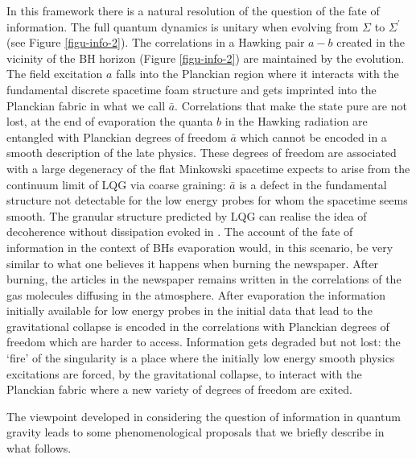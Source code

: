 \documentclass[aps, nofootinbib,superscriptaddress,12pt]{revtex4-2}
\begin{document}
In this framework there is a natural resolution of the question of the fate of information. The full quantum dynamics is unitary when evolving from $\Sigma$ to $\Sigma^{\prime}$ (see Figure \ref{figu-info-2}). The correlations in a Hawking pair $a-b$ created in the vicinity of the BH horizon (Figure \ref{figu-info-2}) are maintained by the evolution. The field excitation $a$ falls into the Planckian region where it interacts with the fundamental discrete spacetime foam structure and gets imprinted into the Planckian fabric in what we call $\bar a$. Correlations that make the state pure are not lost, at the end of evaporation the quanta $b$ in the Hawking radiation are entangled with Planckian degrees of freedom $\bar a$ which cannot be encoded in a smooth description of the late physics. These degrees of freedom are associated with a large degeneracy of the flat Minkowski spacetime expects to arise from the continuum limit of LQG via coarse graining: $\bar a$ is a defect in the fundamental structure not detectable for the low energy probes for whom the spacetime seems smooth.  
The granular structure predicted by LQG can realise the idea of decoherence without dissipation evoked in \cite{Unruh:1995gn, Unruh:2012vd}. The account of the fate of information in the context of BHs evaporation would, in this scenario, be very similar to what one believes it happens when burning the newspaper.  After burning, the articles in the newspaper remains written in the correlations of the gas molecules diffusing in the atmosphere. After evaporation the information initially available for low energy probes in the initial data that lead to the gravitational collapse is encoded in the correlations with Planckian degrees of freedom which are harder to access. Information gets degraded but not lost: the `fire' of the singularity is a place where the initially low energy smooth physics excitations are forced, by the gravitational collapse, to interact with the Planckian fabric where a new variety of degrees of freedom are exited.     

The viewpoint developed in considering the question of information in quantum gravity leads to some phenomenological proposals that we briefly describe in what follows. 
\end{document}
